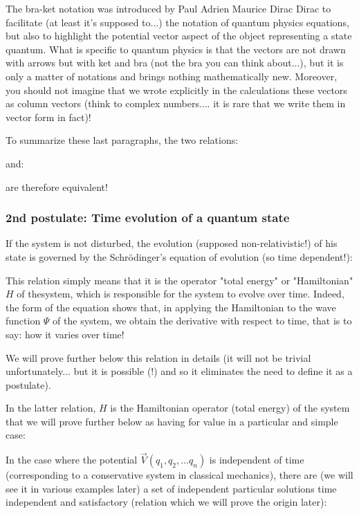 	
	
	\begin{tcolorbox}[title=Remark,colframe=black,arc=10pt]
	The bra-ket notation was introduced by Paul Adrien Maurice Dirac Dirac to facilitate (at least it's supposed to...) the notation of quantum physics equations, but also to highlight the potential vector aspect of the object representing a state quantum. What is specific to quantum physics is that the vectors are not drawn with arrows but with ket and bra (not the bra you can think about...), but it is only a matter of notations and brings nothing mathematically new. Moreover, you should not imagine that we wrote explicitly in the calculations these vectors as column vectors (think to complex numbers.... it is rare that we write them in vector form in fact)!
	\end{tcolorbox}
	
	To summarize these last paragraphs, the two relations:
	
	and:
	
	are therefore equivalent!
	
	\subsubsection{2nd postulate: Time evolution of a quantum state}
	If the system is not disturbed, the evolution (supposed non-relativistic!) of his state is governed by the Schrödinger's equation of evolution (so time dependent!):
	
	This relation simply means that it is the operator "total energy" or "Hamiltonian" $H$ of thesystem, which is responsible for the system to evolve over time. Indeed, the form of the equation shows that, in applying the Hamiltonian to the wave function $\Psi$ of the system, we obtain the derivative with respect to time, that is to say: how it varies over time!
	\begin{tcolorbox}[title=Remark,colframe=black,arc=10pt]
	We will prove further below this relation in details (it will not be trivial unfortunately... but it is possible (!) and so it eliminates the need to define it as a postulate).
	\end{tcolorbox}
	In the latter relation, $H$ is the Hamiltonian operator (total energy) of the system that we will prove further below as having for value in a particular and simple case:
	
	In the case where the potential $\vec{V}(q_1,q_2,...q_n)$ is independent of time (corresponding to a conservative system in classical mechanics), there are (we will see it in various  examples later) a set of independent particular solutions time independent and satisfactory (relation which we will prove the origin later):
	
